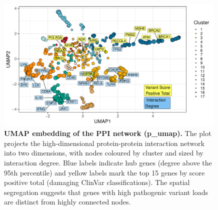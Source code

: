 \begin{figure}[ht]
  \centering
  \includegraphics[width=0.99\textwidth]{../images/untangleR_ppi_network_umap.pdf}
  \caption{
    \textbf{UMAP embedding of the PPI network (p\_umap).} 
    The plot projects the high-dimensional protein-protein interaction network into two dimensions, with nodes coloured by cluster and sized by interaction degree. Blue labels indicate hub genes (degree above the 95th percentile) and yellow labels mark the top 15 genes by score positive total (damaging ClinVar classifications). The spatial segregation suggests that genes with high pathogenic variant loads are distinct from highly connected nodes.
  }
  \label{fig:p_umap}
\end{figure}



\FloatBarrier
%

